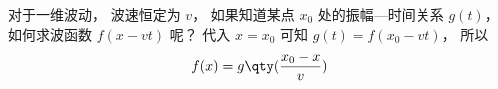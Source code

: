 
对于一维波动， 波速恒定为 $v$， 如果知道某点 $x_0$ 处的振幅—时间关系 $g(t)$， 如何求波函数 $f(x - vt)$ 呢？ 代入 $x = x_0$ 可知 $g(t) = f(x_0 - vt)$， 所以
\begin{equation}
f(x) = g\qty(\frac{x_0 - x}{v})
\end{equation}
